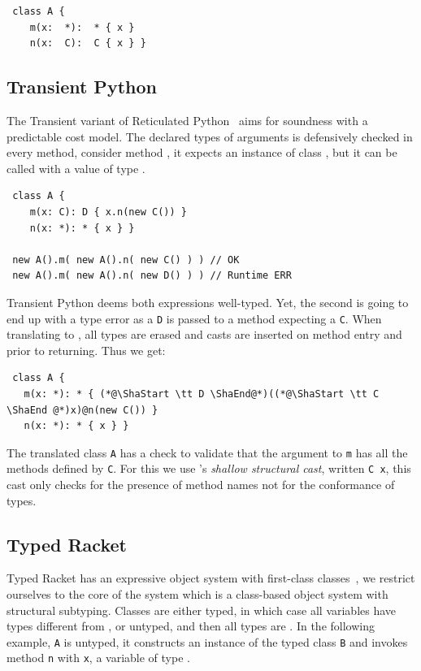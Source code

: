 \documentclass[a4paper,USenglish]{tex/lipics-v2016}
\newcommand{\code}[1]{{\tt #1}\xspace}
\begin{document}
\begin{lstlisting}
 class A {
    m(x:  *):  * { x }
    n(x:  C):  C { x } }
\end{lstlisting}

\subsection{Transient Python}

The Transient variant of Reticulated Python~\cite{siek14} aims for soundness
with a predictable cost model. The declared types of arguments is
defensively checked in every method, consider method \m, it expects an
instance of class \C, but it can be called with a value of type \any.

\begin{lstlisting}
 class A {
    m(x: C): D { x.n(new C()) }
    n(x: *): * { x } }

 new A().m( new A().n( new C() ) ) // OK
 new A().m( new A().n( new D() ) ) // Runtime ERR
\end{lstlisting}

\noindent
Transient Python deems both expressions well-typed. Yet, the second is going
to end up with a type error as a \code D is passed to a method expecting a
\code C.  When translating to \kafka, all types are erased and casts are
inserted on method entry and prior to returning. Thus we get:

\begin{lstlisting}
 class A {
   m(x: *): * { (*@\ShaStart \tt D \ShaEnd@*)((*@\ShaStart \tt C \ShaEnd @*)x)@n(new C()) }
   n(x: *): * { x } }
\end{lstlisting}

\noindent The translated class \code A has a check to validate that the
argument to \code m has all the methods defined by \code C. For this we use
\kafka's \emph{shallow structural cast}, written {\ShaStart \tt C \ShaEnd
  x}, this cast only checks for the presence of method names not for the
conformance of types.


\subsection{Typed Racket}

Typed Racket has an expressive object system with first-class
classes~\cite{Takikawa:2012}, we restrict ourselves to the core of the
system which is a class-based object system with structural subtyping.
Classes are either typed, in which case all variables have types different
from \any, or untyped, and then all types are \any.  In the following
example, \code A is untyped, it constructs an instance of the typed class
\code{B} and invokes method \code{n} with \code x, a variable of type \any.
\end{document}
